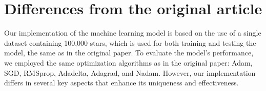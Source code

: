 \documentclass[journal,onecolumn]{IEEEtran}
\begin{document}

%




\section{Differences from the original article}
Our implementation of the machine learning model is based on the use of a single dataset containing 100,000 stars, which is used for both training and testing the model, the same as in the original paper.  
To evaluate the model's performance, we employed the same optimization algorithms as in the original paper: Adam, SGD, RMSprop, Adadelta, Adagrad, and Nadam. However, our implementation differs in several key aspects that enhance its uniqueness and effectiveness.  
\end{document}

